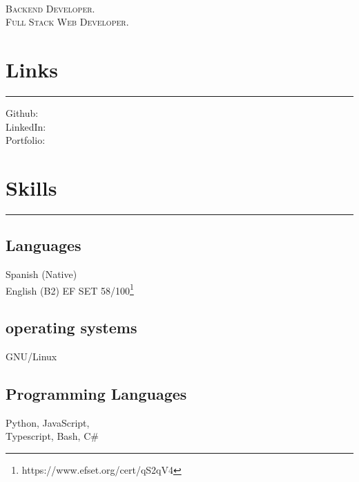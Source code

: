 \documentclass[]{rahulworld-resume}
\begin{document}
%
%

\begin{minipage}[t]{0.33\textwidth}
    \begin{large}
        \\
    \end{large}

    \textsc{Backend Developer.}\\
    \textsc{Full Stack Web Developer.}


    \section{Links}
    \noindent\rule{5cm}{0.4pt}

    Github: \href{https://github.com/jamerrq}{} \\
    LinkedIn: \href{https://www.linkedin.com/in/jamerrq}{} \\
    Portfolio: \href{https://jamerrq.deno.dev/}{}
    \section{Skills}
    \noindent\rule{5cm}{0.4pt}
    \subsection{Languages}
    Spanish (Native)\\
    English (B2) EF SET 58/100\footnote{https://www.efset.org/cert/qS2qV4}\\
    \vspace{1pt}
    \subsection{operating systems}
    GNU/Linux\\
    \vspace{1pt}
    \subsection{Programming Languages}
    Python, JavaScript,\\
    Typescript, Bash, C\#\\
    \vspace{1pt}

\end{minipage}
\end{document}
